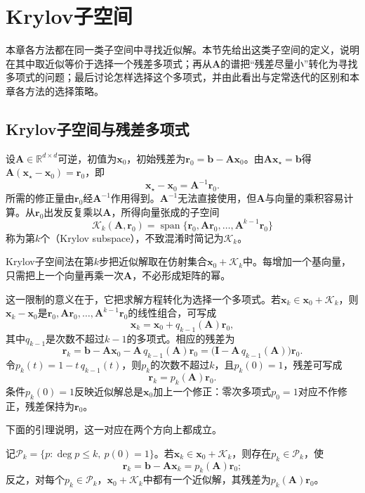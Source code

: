 \section{Krylov子空间}
\label{sec:ls-krylov-subspaces}

本章各方法都在同一类子空间中寻找近似解。本节先给出这类子空间的定义，说明在其中取近似等价于选择一个残差多项式；再从$\bm A$的谱把“残差尽量小”转化为寻找多项式的问题；最后讨论怎样选择这个多项式，并由此看出与定常迭代的区别和本章各方法的选择策略。

\subsection{Krylov子空间与残差多项式}

设$\bm A\in\mathbb R^{d\times d}$可逆，初值为$\bm x_0$，初始残差为$\bm r_0=\bm b-\bm A\bm x_0$。由$\bm A\bm x_\star=\bm b$得$\bm A(\bm x_\star-\bm x_0)=\bm r_0$，即
\[
 \bm x_\star-\bm x_0=\bm A^{-1}\bm r_0 .
\]
所需的修正量由$\bm r_0$经$\bm A^{-1}$作用得到。$\bm A^{-1}$无法直接使用，但$\bm A$与向量的乘积容易计算。从$\bm r_0$出发反复乘以$\bm A$，所得向量张成的子空间
\begin{equation}
 \mathcal K_k(\bm A,\bm r_0)=\operatorname{span}\{\bm r_0,\bm A\bm r_0,\ldots,\bm A^{k-1}\bm r_0\}
 \label{eq:ls-krylov-subspace}
\end{equation}
称为第$k$个（Krylov subspace），不致混淆时简记为$\mathcal K_k$。

Krylov子空间法在第$k$步把近似解取在仿射集合$\bm x_0+\mathcal K_k$中。每增加一个基向量，只需把上一个向量再乘一次$\bm A$，不必形成矩阵的幂。

这一限制的意义在于，它把求解方程转化为选择一个多项式。若$\bm x_k\in\bm x_0+\mathcal K_k$，则$\bm x_k-\bm x_0$是$\bm r_0,\bm A\bm r_0,\ldots,\bm A^{k-1}\bm r_0$的线性组合，可写成
\[
 \bm x_k=\bm x_0+q_{k-1}(\bm A)\bm r_0 ,
\]
其中$q_{k-1}$是次数不超过$k-1$的多项式。相应的残差为
\[
 \bm r_k=\bm b-\bm A\bm x_0-\bm A\,q_{k-1}(\bm A)\bm r_0=\bigl(\bm I-\bm A\,q_{k-1}(\bm A)\bigr)\bm r_0 .
\]
令$p_k(t)=1-t\,q_{k-1}(t)$，则$p_k$的次数不超过$k$，且$p_k(0)=1$，残差可写成
\[
 \bm r_k=p_k(\bm A)\bm r_0 .
\]
条件$p_k(0)=1$反映近似解总是$\bm x_0$加上一个修正：零次多项式$p_0=1$对应不作修正，残差保持为$\bm r_0$。

下面的引理说明，这一对应在两个方向上都成立。

\begin{lemma}[Krylov残差多项式]
\label{lem:ls-krylov-residual-polynomial}
记$\mathcal P_k=\{p:\deg p\le k,\ p(0)=1\}$。若$\bm x_k\in\bm x_0+\mathcal K_k$，则存在$p_k\in\mathcal P_k$，使
\begin{equation}
 \label{eq:ls-krylov-residual-polynomial}
 \bm r_k=\bm b-\bm A\bm x_k=p_k(\bm A)\bm r_0 ;
\end{equation}
反之，对每个$p_k\in\mathcal P_k$，$\bm x_0+\mathcal K_k$中都有一个近似解，其残差为$p_k(\bm A)\bm r_0$。
\end{lemma}

